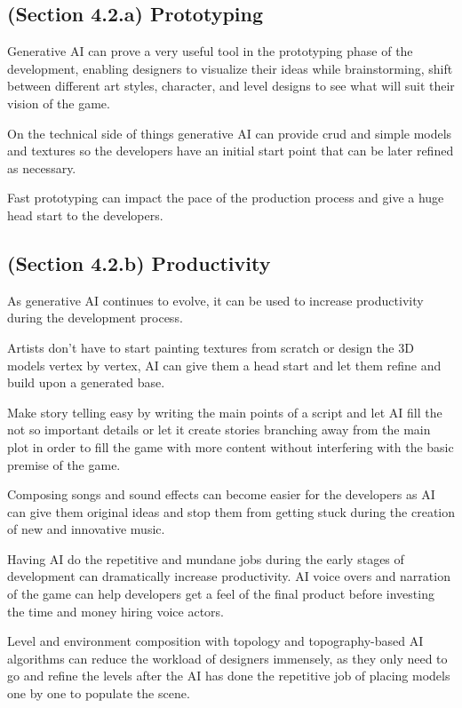 \documentclass[a4paper,one side,12pt]{book}
\begin{document}
\subsection{(Section 4.2.a) Prototyping}

Generative AI can prove a very useful tool in the prototyping phase of
the development, enabling designers to visualize their ideas while
brainstorming, shift between different art styles, character, and level
designs to see what will suit their vision of the game.

On the technical side of things generative AI can provide crud and
simple models and textures so the developers have an initial start point
that can be later refined as necessary.

Fast prototyping can impact the pace of the production process and give
a huge head start to the developers.


\subsection{(Section 4.2.b) Productivity}

As generative AI continues to evolve, it can be used to increase
productivity during the development process.

Artists don't have to start painting textures from scratch or design the
3D models vertex by vertex, AI can give them a head start and let them
refine and build upon a generated base.

Make story telling easy by writing the main points of a script and let
AI fill the not so important details or let it create stories branching
away from the main plot in order to fill the game with more content
without interfering with the basic premise of the game.

Composing songs and sound effects can become easier for the developers
as AI can give them original ideas and stop them from getting stuck
during the creation of new and innovative music.

Having AI do the repetitive and mundane jobs during the early stages of
development can dramatically increase productivity. AI voice overs and
narration of the game can help developers get a feel of the final
product before investing the time and money hiring voice actors.

Level and environment composition with topology and topography-based AI
algorithms can reduce the workload of designers immensely, as they only
need to go and refine the levels after the AI has done the repetitive
job of placing models one by one to populate the scene.
\end{document}
